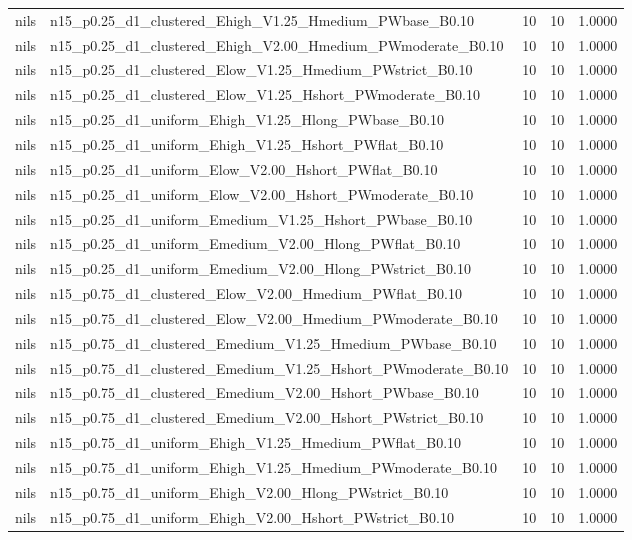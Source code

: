 \begin{tabular}{llrrr}
nils & n15_p0.25_d1_clustered_Ehigh_V1.25_Hmedium_PWbase_B0.10 & 10 & 10 & 1.0000 \\
nils & n15_p0.25_d1_clustered_Ehigh_V2.00_Hmedium_PWmoderate_B0.10 & 10 & 10 & 1.0000 \\
nils & n15_p0.25_d1_clustered_Elow_V1.25_Hmedium_PWstrict_B0.10 & 10 & 10 & 1.0000 \\
nils & n15_p0.25_d1_clustered_Elow_V1.25_Hshort_PWmoderate_B0.10 & 10 & 10 & 1.0000 \\
nils & n15_p0.25_d1_uniform_Ehigh_V1.25_Hlong_PWbase_B0.10 & 10 & 10 & 1.0000 \\
nils & n15_p0.25_d1_uniform_Ehigh_V1.25_Hshort_PWflat_B0.10 & 10 & 10 & 1.0000 \\
nils & n15_p0.25_d1_uniform_Elow_V2.00_Hshort_PWflat_B0.10 & 10 & 10 & 1.0000 \\
nils & n15_p0.25_d1_uniform_Elow_V2.00_Hshort_PWmoderate_B0.10 & 10 & 10 & 1.0000 \\
nils & n15_p0.25_d1_uniform_Emedium_V1.25_Hshort_PWbase_B0.10 & 10 & 10 & 1.0000 \\
nils & n15_p0.25_d1_uniform_Emedium_V2.00_Hlong_PWflat_B0.10 & 10 & 10 & 1.0000 \\
nils & n15_p0.25_d1_uniform_Emedium_V2.00_Hlong_PWstrict_B0.10 & 10 & 10 & 1.0000 \\
nils & n15_p0.75_d1_clustered_Elow_V2.00_Hmedium_PWflat_B0.10 & 10 & 10 & 1.0000 \\
nils & n15_p0.75_d1_clustered_Elow_V2.00_Hmedium_PWmoderate_B0.10 & 10 & 10 & 1.0000 \\
nils & n15_p0.75_d1_clustered_Emedium_V1.25_Hmedium_PWbase_B0.10 & 10 & 10 & 1.0000 \\
nils & n15_p0.75_d1_clustered_Emedium_V1.25_Hshort_PWmoderate_B0.10 & 10 & 10 & 1.0000 \\
nils & n15_p0.75_d1_clustered_Emedium_V2.00_Hshort_PWbase_B0.10 & 10 & 10 & 1.0000 \\
nils & n15_p0.75_d1_clustered_Emedium_V2.00_Hshort_PWstrict_B0.10 & 10 & 10 & 1.0000 \\
nils & n15_p0.75_d1_uniform_Ehigh_V1.25_Hmedium_PWflat_B0.10 & 10 & 10 & 1.0000 \\
nils & n15_p0.75_d1_uniform_Ehigh_V1.25_Hmedium_PWmoderate_B0.10 & 10 & 10 & 1.0000 \\
nils & n15_p0.75_d1_uniform_Ehigh_V2.00_Hlong_PWstrict_B0.10 & 10 & 10 & 1.0000 \\
nils & n15_p0.75_d1_uniform_Ehigh_V2.00_Hshort_PWstrict_B0.10 & 10 & 10 & 1.0000 \\

\end{tabular}
